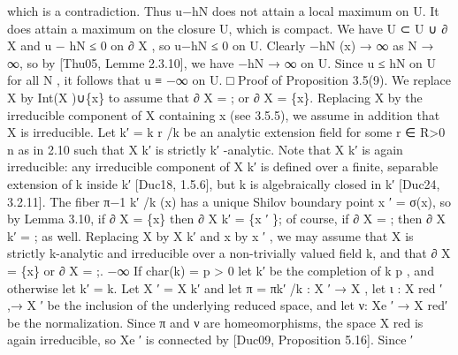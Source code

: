 \documentclass[
  10pt,
]{article}
\newenvironment{Shaded}{}{}
\newcommand{\NormalTok}[1]{#1}
\begin{document}
\begin{Shaded}
\begin{Highlighting}[]
\NormalTok{which is a contradiction. Thus u−hN does not attain a local maximum on U. It does attain}
\NormalTok{a maximum on the closure U, which is compact. We have U ⊂ U ∪ ∂ X and u − hN ≤ 0 on}
\NormalTok{∂ X , so u−hN ≤ 0 on U. Clearly −hN (x) → ∞ as N → ∞, so by [Thu05, Lemme 2.3.10],}
\NormalTok{we have −hN → ∞ on U. Since u ≤ hN on U for all N , it follows that u ≡ −∞ on U. □}
\NormalTok{Proof of Proposition 3.5(9). We replace X by Int(X )∪\{x\} to assume that ∂ X = ; or ∂ X =}
\NormalTok{\{x\}. Replacing X by the irreducible component of X containing x (see 3.5.5), we assume}
\NormalTok{in addition that X is irreducible. Let k′ = k r /k be an analytic extension field for some}
\NormalTok{r ∈ R\textgreater{}0 n}
\NormalTok{           as in 2.10 such that X k′ is strictly k′ {-}analytic. Note that X k′ is again irreducible:}
\NormalTok{any irreducible component of X k′ is defined over a finite, separable extension of k inside}
\NormalTok{k′ [Duc18, 1.5.6], but k is algebraically closed in k′ [Duc24, 3.2.11]. The fiber π−1         k′ /k}
\NormalTok{                                                                                                    (x)}
\NormalTok{has a unique Shilov boundary point x ′ = σ(x), so by Lemma 3.10, if ∂ X = \{x\} then}
\NormalTok{∂ X k′ = \{x ′ \}; of course, if ∂ X = ; then ∂ X k′ = ; as well. Replacing X by X k′ and x by}
\NormalTok{x ′ , we may assume that X is strictly k{-}analytic and irreducible over a non{-}trivially valued}
\NormalTok{field k, and that ∂ X = \{x\} or ∂ X = ;.}
\NormalTok{                                                             −∞}
\NormalTok{    If char(k) = p \textgreater{} 0 let k′ be the completion of k p , and otherwise let k′ = k. Let X ′ =}
\NormalTok{X k′ and let π = πk′ /k : X ′ → X , let ι : X red}
\NormalTok{                                              ′}
\NormalTok{                                                  ,→ X ′ be the inclusion of the underlying reduced}
\NormalTok{space, and let ν: Xe ′ → X red′}
\NormalTok{                                 be the normalization. Since π and ν are homeomorphisms,}
\NormalTok{the space X red is again irreducible, so Xe ′ is connected by [Duc09, Proposition 5.16]. Since}
\NormalTok{              ′}


\end{Highlighting}
\end{Shaded}
\end{document}
